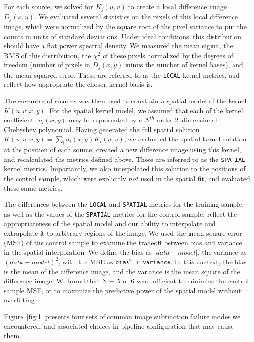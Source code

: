 \documentclass[iop]{emulateapj}
\begin{document}
For each source, we solved for $K_j(u,v)$ to create a local difference image $D_j(x,y)$.
We evaluated several statistics on the pixels of this local difference image, which were normalized by the square root of the pixel variance to put the counts in units of standard deviations.
Under ideal conditions, this distribution should have a flat power spectral density.
We measured the mean sigma, the RMS of this distribution, the $\chi^2$ of these pixels normalized by the degrees of freedom (number of pixels in $D_j(x,y)$ minus the number of kernel bases), and the mean squared error.
These are referred to as the {\tt LOCAL} kernel metrics, and reflect how appropriate the chosen kernel basis is.

The ensemble of sources was then used to constrain a spatial model of the kernel $K(u,v;x,y)$.
For the spatial kernel model, we assumed that each of the kernel coefficients $a_i(x,y)$ may be represented by a $N^{th}$ order 2--dimensional Chebyshev polynomial.
Having generated the full spatial solution $K(u,v;x,y) = \sum_i a_i(x,y) K_i(u,v)$, we evaluated the spatial kernel solution at the position of each source, created a new difference image using this kernel, and recalculated the metrics defined above.
These are referred to as the {\tt SPATIAL} kernel metrics.
Importantly, we also interpolated this solution to the positions of the control sample, which were explicitly {\it not} used in the spatial fit, and evaluated these same metrics.

The differences between the {\tt LOCAL} and {\tt SPATIAL} metrics for the training sample, as well as the values of the {\tt SPATIAL} metrics for the control sample, reflect the appropriateness of the spatial model and our ability to interpolate and extrapolate it to arbitrary regions of the image.
We used the mean square error (MSE) of the control sample to examine the tradeoff between bias and variance in the spatial interpolation.
We define the bias as $\left| data - model \right|$, the variance as $(data - model)^2$, with the MSE as {\tt bias$^2$ + variance}.  
In this context, the bias is the mean of the difference image, and the variance is the mean square of the difference image.
We found that N = 5 or 6 was sufficient to minimize the control sample MSE, or to maximize the predictive power of the spatial model without overfitting.

Figure~\ref{fig:1} presents four sets of common image subtraction failure modes we encountered, and associated choices in pipeline configuration that may cause them.
\end{document}
